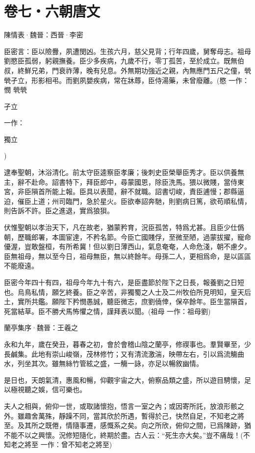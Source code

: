 \documentclass[12pt,a4paper]{ctexbook}
\begin{document}
\section{卷七・六朝唐文}
陳情表·魏晉：西晉·李密 \par
臣密言：臣以險釁，夙遭閔凶。生孩六月，慈父見背；行年四歲，舅奪母志。祖母劉愍臣孤弱，躬親撫養。臣少多疾病，九歲不行，零丁孤苦，至於成立。既無伯叔，終鮮兄弟，門衰祚薄，晚有兒息。外無期功強近之親，內無應門五尺之僮，煢煢孑立，形影相弔。而劉夙嬰疾病，常在牀蓐，臣侍湯藥，未曾廢離。(愍 一作：憫 煢煢\par
孑立\par
一作：\par
獨立\par
)\par
逮奉聖朝，沐浴清化。前太守臣逵察臣孝廉；後刺史臣榮舉臣秀才。臣以供養無主，辭不赴命。詔書特下，拜臣郎中，尋蒙國恩，除臣洗馬。猥以微賤，當侍東宮，非臣隕首所能上報。臣具以表聞，辭不就職。詔書切峻，責臣逋慢；郡縣逼迫，催臣上道；州司臨門，急於星火。臣欲奉詔奔馳，則劉病日篤，欲苟順私情，則告訴不許。臣之進退，實爲狼狽。\par
伏惟聖朝以孝治天下，凡在故老，猶蒙矜育，況臣孤苦，特爲尤甚。且臣少仕僞朝，歷職郎署，本圖宦達，不矜名節。今臣亡國賤俘，至微至陋，過蒙拔擢，寵命優渥，豈敢盤桓，有所希冀！但以劉日薄西山，氣息奄奄，人命危淺，朝不慮夕。臣無祖母，無以至今日，祖母無臣，無以終餘年。母孫二人，更相爲命，是以區區不能廢遠。\par
臣密今年四十有四，祖母今年九十有六，是臣盡節於陛下之日長，報養劉之日短也。烏鳥私情，願乞終養。臣之辛苦，非獨蜀之人士及二州牧伯所見明知，皇天后土，實所共鑑。願陛下矜憫愚誠，聽臣微志，庶劉僥倖，保卒餘年。臣生當隕首，死當結草。臣不勝犬馬怖懼之情，謹拜表以聞。(祖母 一作：祖母劉)\par
蘭亭集序·魏晉：王羲之 \par
永和九年，歲在癸丑，暮春之初，會於會稽山陰之蘭亭，修禊事也。羣賢畢至，少長鹹集。此地有崇山峻嶺，茂林修竹；又有清流激湍，映帶左右，引以爲流觴曲水，列坐其次。雖無絲竹管絃之盛，一觴一詠，亦足以暢敘幽情。\par
是日也，天朗氣清，惠風和暢，仰觀宇宙之大，俯察品類之盛，所以遊目騁懷，足以極視聽之娛，信可樂也。\par
夫人之相與，俯仰一世，或取諸懷抱，悟言一室之內；或因寄所託，放浪形骸之外。雖趣舍萬殊，靜躁不同，當其欣於所遇，暫得於己，快然自足，不知老之將至。及其所之既倦，情隨事遷，感慨系之矣。向之所欣，俯仰之間，已爲陳跡，猶不能不以之興懷。況修短隨化，終期於盡。古人云：“死生亦大矣。”豈不痛哉！(不知老之將至 一作：曾不知老之將至)\par
\end{document}
